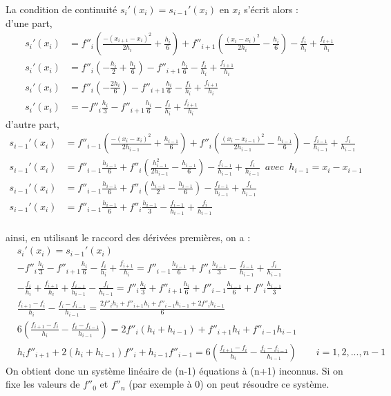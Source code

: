 \documentclass{article}
\begin{document}
\newpage
\begingroup\raggedleft
La condition de continuit\'{e} $s_i'(x_i) = s_{i-1}'(x_i)$ en $x_i$ s'\'{e}crit alors :
\endgroup
\\[8pt]
d'une part,
\begin{align*}
s_i'(x_i) & = f''_i(\frac{-(x_{i+1}-x_i)^2}{2h_i}+\frac{h_i}{6}) + f''_{i+1}(\frac{(x_i-x_i)^2}{2h_i}-\frac{h_i}{6}) - \frac{f_i}{h_i} + \frac{f_{i+1}}{h_i}
\\[5pt]
s_i'(x_i) & = f''_i(-\frac{h_i}{2}+\frac{h_i}{6}) - f''_{i+1}\frac{h_i}{6} - \frac{f_i}{h_i} + \frac{f_{i+1}}{h_i}
\\[5pt]
s_i'(x_i) & = f''_i(-\frac{2h_i}{6}) - f''_{i+1}\frac{h_i}{6} - \frac{f_i}{h_i} + \frac{f_{i+1}}{h_i}
\\[5pt]
s_i'(x_i) & = -f''_i\frac{h_i}{3} - f''_{i+1}\frac{h_i}{6} - \frac{f_i}{h_i} + \frac{f_{i+1}}{h_i}
\end{align*}
d'autre part,
\begin{align*}
s_{i-1}'(x_i)& = f''_{i-1}(\frac{-(x_i-x_i)^2}{2h_{i-1}}+\frac{h_{i-1}}{6}) + f''_i(\frac{(x_i-x_{i-1})^2}{2h_{i-1}}-\frac{h_{i-1}}{6}) - \frac{f_{i-1}}{h_{i-1}} + \frac{f_{i}}{h_{i-1}}
\\[5pt]
s_{i-1}'(x_i)& = f''_{i-1}\frac{h_{i-1}}{6} + f''_i(\frac{h_{i-1}^2}{2h_{i-1}}-\frac{h_{i-1}}{6}) - \frac{f_{i-1}}{h_{i-1}} + \frac{f_{i}}{h_{i-1}} \;\ avec \;\; h_{i-1}=x_i-x_{i-1}
\\[5pt]
s_{i-1}'(x_i)& = f''_{i-1}\frac{h_{i-1}}{6} + f''_i(\frac{h_{i-1}}{2}-\frac{h_{i-1}}{6}) - \frac{f_{i-1}}{h_{i-1}} + \frac{f_{i}}{h_{i-1}}
\\[5pt]
s_{i-1}'(x_i)& = f''_{i-1}\frac{h_{i-1}}{6} + f''_i\frac{h_{i-1}}{3} - \frac{f_{i-1}}{h_{i-1}} + \frac{f_{i}}{h_{i-1}}
\end{align*}
\\
ainsi, en utilisant le raccord des d\'{e}riv\'{e}es premi\`{e}res, on a :
\begin{align*}
&s_i'(x_i) = s_{i-1}'(x_i)
\\[5pt]
&-f''_i\frac{h_i}{3} - f''_{i+1}\frac{h_i}{6} - \frac{f_i}{h_i} + \frac{f_{i+1}}{h_i} = f''_{i-1}\frac{h_{i-1}}{6} + f''_i\frac{h_{i-1}}{3} - \frac{f_{i-1}}{h_{i-1}} + \frac{f_{i}}{h_{i-1}}
\\[5pt]
&- \frac{f_i}{h_i} + \frac{f_{i+1}}{h_i} + \frac{f_{i-1}}{h_{i-1}} - \frac{f_{i}}{h_{i-1}} = f''_i\frac{h_i}{3} + f''_{i+1}\frac{h_i}{6} + f''_{i-1}\frac{h_{i-1}}{6} + f''_i\frac{h_{i-1}}{3}
\\[5pt]
&\frac{f_{i+1}-f_i}{h_i} - \frac{f_{i}-f_{i-1}}{h_{i-1}} =\frac{2f''_ih_i+f''_{i+1}h_i+f''_{i-1}h_{i-1}+2f''_ih_{i-1} }{6} 
\\[5pt]
&6(\frac{f_{i+1}-f_i}{h_i} - \frac{f_{i}-f_{i-1}}{h_{i-1}}) = 2f''_i(h_i+h_{i-1})+f''_{i+1}h_i+f''_{i-1}h_{i-1}
\\[5pt]
&h_i f''_{i+1} +2(h_i+h_{i-1})f''_i + h_{i-1}f''_{i-1}=6(\frac{f_{i+1}-f_i}{h_i}-\frac{f_i-f_{i-1}}{h_{i-1}})  \qquad i= 1,2,...,n-1 
\end{align*}
\begingroup\raggedleft
On obtient donc un syst\`{e}me lin\'{e}aire de (n-1) \'{e}quations \`a (n+1) inconnus. Si on fixe les valeurs de $f''_0$ et $f''_n$ (par exemple \`a 0) on peut r\'{e}soudre ce syst\`{e}me.  
\endgroup
\end{document}
